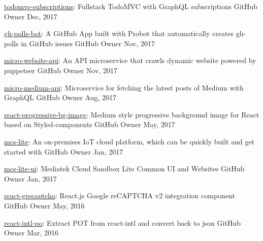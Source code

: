 \begin{cvhonors}
  \cvhonor
    {\href{https://github.com/evenchange4/todomvc-subscriptions}{todomvc-subscriptions}: \textmd{Fullstack TodoMVC with GraphQL subscriptions}}
    {GitHub} %
    {Owner} %
    {Dec, 2017} %

  \cvhonor
    {\href{https://github.com/evenchange4/gh-polls-bot}{gh-polls-bot}: \textmd{A GitHub App built with Probot that automatically creates gh-polls in GitHub issues}}
    {GitHub} %
    {Owner} %
    {Nov, 2017} %

  \cvhonor
    {\href{https://github.com/evenchange4/micro-website-api}{micro-website-api}: \textmd{An API microservice that crawls dynamic website powered by puppeteer}}
    {GitHub} %
    {Owner} %
    {Nov, 2017} %

  \cvhonor
    {\href{https://github.com/evenchange4/micro-medium-api}{micro-medium-api}: \textmd{Microservice for fetching the latest posts of Medium with GraphQL}}
    {GitHub} %
    {Owner} %
    {Aug, 2017} %

  \cvhonor
    {\href{https://github.com/evenchange4/react-progressive-bg-image}{react-progressive-bg-image}: \textmd{Medium style progressive background image for React based on Styled-components}}
    {GitHub} %
    {Owner} %
    {May, 2017} %

  \cvhonor
    {\href{https://github.com/MCS-Lite/mcs-lite}{mcs-lite}: \textmd{An on-premises IoT cloud platform, which can be quickly built and get started with}}
    {GitHub} %
    {Owner} %
    {Jan, 2017} %

  \cvhonor
    {\href{https://github.com/MCS-Lite/mcs-lite}{mcs-lite-ui}: \textmd{Mediatek Cloud Sandbox Lite Common UI and Websites}}
    {GitHub} %
    {Owner} %
    {Jan, 2017} %

  \cvhonor
    {\href{https://github.com/evenchange4/react-grecaptcha}{react-grecaptcha}: \textmd{React.js Google reCAPTCHA v2 integration component}}
    {GitHub} %
    {Owner} %
    {May, 2016} %

  \cvhonor
    {\href{https://github.com/evenchange4/react-intl-po}{react-intl-po}: \textmd{Extract POT from react-intl and convert back to json}}
    {GitHub} %
    {Owner} %
    {Mar, 2016} %

\end{cvhonors}
